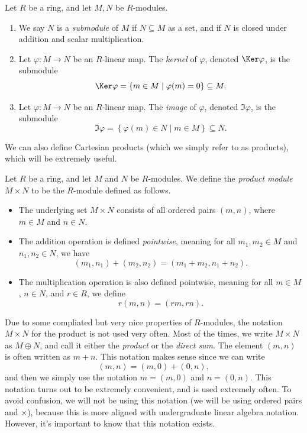 \begin{definition}\label{dfn:submod-kernel-image}
	Let $R$ be a ring, and let $M,N$ be $R$-modules.
	\begin{enumerate}
		\item We say $N$ is a \emph{submodule} of $M$ if $N \subseteq M$ as a set, and if $N$ is closed under addition and scalar multiplication.
		\item Let $\varphi : M \to N$ be an $R$-linear map. The \emph{kernel} of $\varphi $, denoted $\Ker \varphi $, is the submodule
		\[
			\Ker \varphi =\left\{ m\in M\mid \varphi (m)=0 \right\} \subseteq M
		.\]
	\item Let $\varphi : M \to N$ be an $R$-linear map. The \emph{image} of $\varphi $, denoted $\Im \varphi $, is the submodule
	\[
		\Im \varphi =\left\{ \varphi (m)\in N\mid m\in M \right\} \subseteq N
	.\]
	\end{enumerate}
\end{definition}

We can also define Cartesian products (which we simply refer to as products), which will be extremely useful.

\begin{definition}\label{dfn:product}
	Let $R$ be a ring, and let $M$ and $N$ be $R$-modules. We define the \emph{product module} $M\times N$ to be the $R$-module defined as follows.
	\begin{itemize}
		\item The underlying set $M\times N$ consists of all ordered pairs $(m,n)$, where $m\in M$ and $n\in N$.
		\item The addition operation is defined \emph{pointwise}, meaning for all $m_1,m_2\in M$ and $n_1,n_2\in N$, we have
		\[
			(m_1,n_1) + (m_2,n_2) = (m_1 + m_2,n_1+n_2)
		.\]	
		\item The multiplication operation is also defined pointwise, meaning for all $m\in M$, $n\in N$, and $r\in R$, we define
		\[
			r(m,n) = (r m,rn)
		.\]
	\end{itemize}
\end{definition}

\begin{notation}\label{notation:direct-sum}
	Due to some compliated but very nice properties of $R$-modules, the notation $M\times N$ for the product is not used very often. Most of the times, we write $M\times N$ as $M\oplus N$, and call it either the \emph{product} or the \emph{direct sum}. The element $(m,n)$ is often written as $m+n$. This notation makes sense since we can write
	\[
		(m,n) = (m,0) + (0,n),
	\]
	and then we simply use the notation $m=(m,0)$ and $n=(0,n)$. This notation turns out to be extremely convenient, and is used extremely often. To avoid confusion, we will not be using this notation (we will be using ordered pairs and $\times $), because this is more aligned with undergraduate linear algebra notation. However, it's important to know that this notation exists.
\end{notation}

